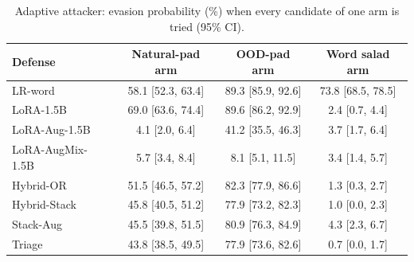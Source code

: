 \begin{table}[t]
\centering
\caption{Adaptive attacker: evasion probability (\%) when every candidate of one arm is tried (95\% CI).}
\label{tab:arms}
\footnotesize
\begin{tabular}{lccc}
\toprule
\textbf{Defense} & \textbf{Natural-pad arm} & \textbf{OOD-pad arm} & \textbf{Word salad arm} \\
\midrule
LR-word & 58.1 [52.3, 63.4] & 89.3 [85.9, 92.6] & 73.8 [68.5, 78.5] \\
LoRA-1.5B & 69.0 [63.6, 74.4] & 89.6 [86.2, 92.9] & 2.4 [0.7, 4.4] \\
LoRA-Aug-1.5B & 4.1 [2.0, 6.4] & 41.2 [35.5, 46.3] & 3.7 [1.7, 6.4] \\
LoRA-AugMix-1.5B & 5.7 [3.4, 8.4] & 8.1 [5.1, 11.5] & 3.4 [1.4, 5.7] \\
Hybrid-OR & 51.5 [46.5, 57.2] & 82.3 [77.9, 86.6] & 1.3 [0.3, 2.7] \\
Hybrid-Stack & 45.8 [40.5, 51.2] & 77.9 [73.2, 82.3] & 1.0 [0.0, 2.3] \\
Stack-Aug & 45.5 [39.8, 51.5] & 80.9 [76.3, 84.9] & 4.3 [2.3, 6.7] \\
Triage & 43.8 [38.5, 49.5] & 77.9 [73.6, 82.6] & 0.7 [0.0, 1.7] \\
\bottomrule
\end{tabular}
\end{table}
